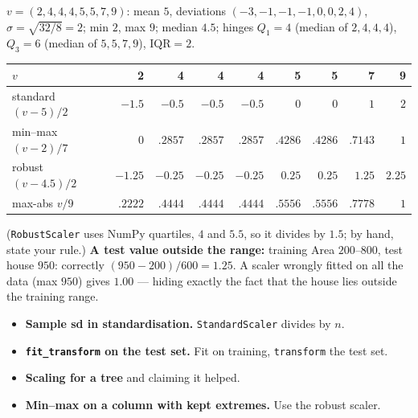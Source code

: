 \documentclass[11pt]{article}
\newcommand{\IQR}{\mathrm{IQR}}
\begin{document}
\begin{worked}
$v = (2, 4, 4, 4, 5, 5, 7, 9)$: mean $5$, deviations $(-3,-1,-1,-1,0,0,2,4)$,
$\sigma = \sqrt{32/8} = 2$; min $2$, max $9$; median $4.5$; hinges
$Q_1 = 4$ (median of $2,4,4,4$), $Q_3 = 6$ (median of $5,5,7,9$), $\IQR = 2$.
\begin{center}
\small
\begin{tabular}{@{}lrrrrrrrr@{}}
\toprule
$v$ & 2 & 4 & 4 & 4 & 5 & 5 & 7 & 9\\ \midrule
standard $(v - 5)/2$ & $-1.5$ & $-0.5$ & $-0.5$ & $-0.5$ & $0$ & $0$ & $1$ & $2$\\
min--max $(v - 2)/7$ & $0$ & $.2857$ & $.2857$ & $.2857$ & $.4286$ & $.4286$ & $.7143$ & $1$\\
robust $(v - 4.5)/2$ & $-1.25$ & $-0.25$ & $-0.25$ & $-0.25$ & $0.25$ & $0.25$ & $1.25$ & $2.25$\\
max-abs $v/9$ & $.2222$ & $.4444$ & $.4444$ & $.4444$ & $.5556$ & $.5556$ & $.7778$ & $1$\\
\bottomrule
\end{tabular}
\end{center}
(\texttt{RobustScaler} uses NumPy quartiles, $4$ and $5.5$, so it divides by
$1.5$; by hand, state your rule.) \textbf{A test value outside the range:}
training Area $200$--$800$, test house $950$: correctly $(950 - 200)/600 =
1.25$. A scaler wrongly fitted on all the data (max $950$) gives $1.00$ ---
hiding exactly the fact that the house lies outside the training range.
\end{worked}

\begin{caution}
\begin{itemize}
  \item \textbf{Sample sd in standardisation.} \texttt{StandardScaler} divides
    by $n$.
  \item \textbf{\texttt{fit\_transform} on the test set.} Fit on training,
    \texttt{transform} the test set.
  \item \textbf{Scaling for a tree} and claiming it helped.
  \item \textbf{Min--max on a column with kept extremes.} Use the robust
    scaler.
\end{itemize}
\end{caution}
\end{document}
